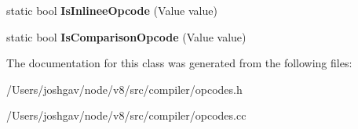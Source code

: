 \begin{DoxyCompactItemize}
\item 
static bool {\bfseries Is\+Inlinee\+Opcode} (Value value)\hypertarget{classv8_1_1internal_1_1compiler_1_1_ir_opcode_a7f0be422453152d34c2917579c7ba5f8}{}\label{classv8_1_1internal_1_1compiler_1_1_ir_opcode_a7f0be422453152d34c2917579c7ba5f8}

\item 
static bool {\bfseries Is\+Comparison\+Opcode} (Value value)\hypertarget{classv8_1_1internal_1_1compiler_1_1_ir_opcode_ab349a2fcedbfaabdccaa50d98e44dba3}{}\label{classv8_1_1internal_1_1compiler_1_1_ir_opcode_ab349a2fcedbfaabdccaa50d98e44dba3}

\end{DoxyCompactItemize}


The documentation for this class was generated from the following files\+:\begin{DoxyCompactItemize}
\item 
/\+Users/joshgav/node/v8/src/compiler/opcodes.\+h\item 
/\+Users/joshgav/node/v8/src/compiler/opcodes.\+cc\end{DoxyCompactItemize}
